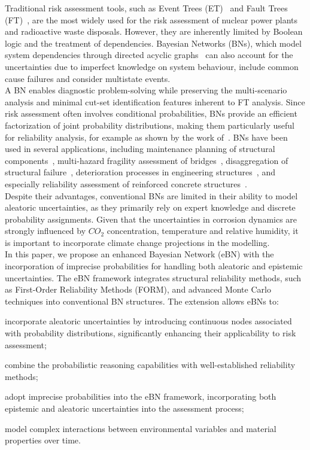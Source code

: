 Traditional risk assessment tools, such as Event Trees (ET)~\cite{papazoglou_mathematical_1998} and Fault Trees (FT)~\cite{kabir_overview_2017}, are the most widely used for the risk assessment of nuclear power plants and radioactive waste disposals.
However, they are inherently limited by Boolean logic and the treatment of dependencies.
Bayesian Networks (BNs), which model system dependencies through directed acyclic graphs~\cite{mahadevan2001bayesian} can also account for the uncertainties due to imperfect knowledge on system behaviour, include common cause failures and consider multistate events. \\
A BN enables diagnostic problem-solving while preserving the multi-scenario analysis and minimal cut-set identification features inherent to FT analysis.
Since risk assessment often involves conditional probabilities, BNs provide an efficient factorization of joint probability distributions, making them particularly useful for reliability analysis, for example as shown by the work of~\textcite{langseth_bayesian_2007}.
BNs have been used in several applications, including maintenance planning of structural components~\cite{morato2022optimal}, multi-hazard fragility assessment of bridges~\cite{gehl2016development, barros2024gaussian}, disaggregation of structural failure~\cite{yazdani2020bayesian}, deterioration processes in engineering structures~\cite{luque2019risk,lee2023dynamic,tran2020dynamic}, and especially reliability assessment of reinforced concrete structures~\cite{hackl2016reliability,hosseini2024dynamic,guo2024mixed}.\\
Despite their advantages, conventional BNs are limited in their ability to model aleatoric uncertainties, as they primarily rely on expert knowledge and discrete probability assignments.
Given that the uncertainties in corrosion dynamics are strongly influenced by $CO_2$ concentration, temperature and relative humidity, it is important to incorporate climate change projections in the modelling.\\
In this paper, we propose an enhanced Bayesian Network (eBN) with the incorporation of imprecise probabilities for handling both aleatoric and epistemic uncertainties.
The eBN framework integrates structural reliability methods, such as First-Order Reliability Methods (FORM), and advanced Monte Carlo techniques into conventional BN structures. 
The extension allows eBNs to: 
\begin{enumerate*}[label=\roman*)]
  \item incorporate aleatoric uncertainties by introducing continuous nodes associated with probability distributions, significantly enhancing their applicability to risk assessment;
  \item combine the probabilistic reasoning capabilities with well-established reliability methods;
  \item adopt imprecise probabilities into the eBN framework, incorporating both epistemic and aleatoric uncertainties into the assessment process;
  \item model complex interactions between environmental variables and material properties over time.
\end{enumerate*} 
